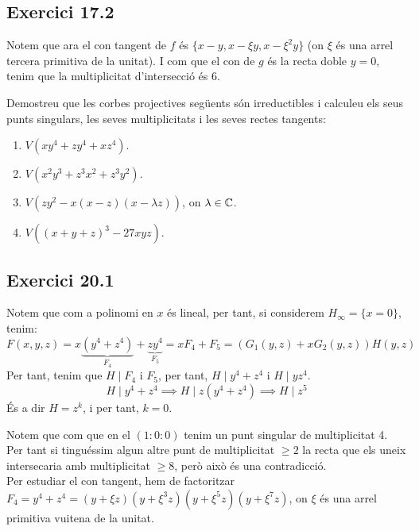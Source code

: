 \documentclass[11pt, a4paper]{article}
\begin{document}
\subsection{Exercici 17.2}
Notem que ara el con tangent de $f$ és $\{x-y,x-\xi y, x-\xi^2 y\}$ (on $\xi$ és una arrel tercera primitiva de la unitat). I com que el con de $g$ és la recta doble $y=0$, tenim que la multiplicitat d'intersecció és $6$.
\newpage
\newpage
\begin{tcolorbox}[title=\section{Exercici 20}]
Demostreu que les corbes projectives següents són irreductibles i calculeu els seus punts singulars, les seves multiplicitats i les seves rectes tangents:
\begin{enumerate}
    \item $V (xy^4 + zy^4 + xz^4)$.
    \item $V (x^2y^3 + z^3x^2 + z^3y^2)$.
    \item $V (zy^2 - x(x - z)(x - \lambda z))$, on $\lambda \in \mathbb C$.
    \item $V ((x + y + z)^3 - 27xyz)$.
\end{enumerate}
\end{tcolorbox}
\subsection{Exercici 20.1}
Notem que com a polinomi en $x$ és lineal, per tant, si considerem $H_\infty=\{x=0\}$, tenim:
\[
    F(x,y,z)=x\underbrace{(y^4+z^4)}_{F_4}+\underbrace{zy^4}_{F_5}=xF_4+F_5=(G_1(y,z)+xG_2(y,z))H(y,z)
\]
Per tant, tenim que $H\mid F_4$ i $F_5$, per tant, $H\mid y^4+z^4$ i $H\mid yz^4$.\\
\[
        H\mid y^4+z^4\implies H\mid z(y^4+z^4)\implies H\mid z^5
\]
És a dir $H=z^k$, i per tant, $k=0$.\par
Notem que com que en el $(1:0:0)$ tenim un punt singular de multiplicitat 4. Per tant si tinguéssim algun altre punt de multiplicitat $\geq 2$ la recta que els uneix intersecaria amb multiplicitat $\geq 8$, però això és una contradicció.\\
Per estudiar el con tangent, hem de factoritzar $F_4=y^4+z^4=(y+\xi z)(y+\xi^3 z)(y+\xi ^5 z)(y+\xi^7 z)$, on $\xi$ és una arrel primitiva vuitena de la unitat.
\end{document}
